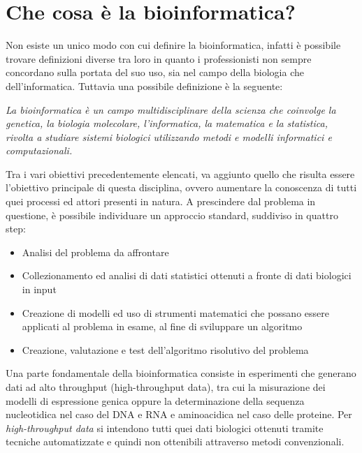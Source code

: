 \section{Che cosa \`e la bioinformatica?}
Non esiste un unico modo con cui definire la bioinformatica, infatti è possibile trovare definizioni diverse tra loro in quanto i professionisti non sempre concordano sulla portata del suo uso, sia nel campo della biologia che dell'informatica. Tuttavia una possibile definizione è la seguente:
\begin{center}
\textit{La bioinformatica è un campo multidisciplinare della scienza che coinvolge la genetica, la biologia molecolare, l'informatica, la matematica e la statistica, rivolta a studiare sistemi biologici utilizzando metodi e modelli informatici e computazionali.}
\end{center}
Tra i vari obiettivi precedentemente elencati, va aggiunto quello che risulta essere l'obiettivo principale di questa disciplina, ovvero aumentare la conoscenza di tutti quei processi ed attori presenti in natura.
\newline
A prescindere dal problema in questione, è possibile individuare un approccio standard, suddiviso in quattro step:
\begin{itemize}
	\item Analisi del problema da affrontare
	\item Collezionamento ed analisi di dati statistici ottenuti a fronte di dati biologici in input
	\item Creazione di modelli ed uso di strumenti matematici che possano essere applicati al problema in esame, al fine di sviluppare un algoritmo
	\item Creazione, valutazione e test dell'algoritmo risolutivo del problema
\end{itemize}
Una parte fondamentale della bioinformatica consiste in esperimenti che generano dati ad alto throughput (high-throughput data), tra cui la misurazione dei modelli di espressione genica oppure la determinazione della sequenza nucleotidica nel caso del DNA e RNA e aminoacidica nel caso delle proteine. Per \textit{high-throughput data} si intendono tutti quei dati biologici ottenuti tramite tecniche automatizzate e quindi non ottenibili attraverso metodi convenzionali.

